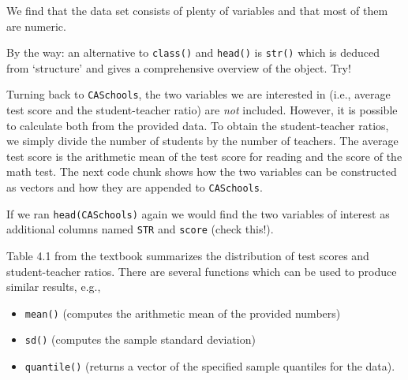 \documentclass[]{book}
\newenvironment{Shaded}{\begin{snugshade}}{\end{snugshade}}
\newcommand{\DecValTok}[1]{\textcolor[rgb]{0.00,0.00,0.81}{#1}}
\newcommand{\StringTok}[1]{\textcolor[rgb]{0.31,0.60,0.02}{#1}}
\newcommand{\CommentTok}[1]{\textcolor[rgb]{0.56,0.35,0.01}{\textit{#1}}}
\newcommand{\OperatorTok}[1]{\textcolor[rgb]{0.81,0.36,0.00}{\textbf{#1}}}
\newcommand{\NormalTok}[1]{#1}
\theoremstyle{definition}
\theoremstyle{definition}
\theoremstyle{definition}
\theoremstyle{remark}
\begin{document}
We find that the data set consists of plenty of variables and that most
of them are numeric.

By the way: an alternative to \texttt{class()} and \texttt{head()} is
\texttt{str()} which is deduced from `structure' and gives a
comprehensive overview of the object. Try!

Turning back to \texttt{CASchools}, the two variables we are interested
in (i.e., average test score and the student-teacher ratio) are
\emph{not} included. However, it is possible to calculate both from the
provided data. To obtain the student-teacher ratios, we simply divide
the number of students by the number of teachers. The average test score
is the arithmetic mean of the test score for reading and the score of
the math test. The next code chunk shows how the two variables can be
constructed as vectors and how they are appended to \texttt{CASchools}.

\begin{Shaded}
\end{Shaded}

If we ran \texttt{head(CASchools)} again we would find the two variables
of interest as additional columns named \texttt{STR} and \texttt{score}
(check this!).

Table 4.1 from the textbook summarizes the distribution of test scores
and student-teacher ratios. There are several functions which can be
used to produce similar results, e.g.,

\begin{itemize}
\item
  \texttt{mean()} (computes the arithmetic mean of the provided numbers)
\item
  \texttt{sd()} (computes the sample standard deviation)
\item
  \texttt{quantile()} (returns a vector of the specified sample
  quantiles for the data).
\end{itemize}
\end{document}

